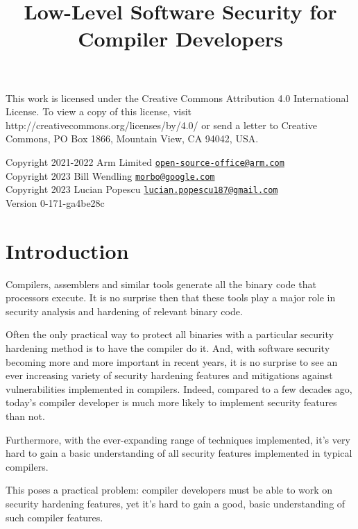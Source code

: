 \documentclass[
  a4paper,
]{report}
\title{Low-Level Software Security for Compiler Developers}
\author{}
\date{}
\begin{document}
\maketitle

\clearpage

\vspace*{\fill}
This work is licensed under the Creative Commons Attribution 4.0 International
License. To view a copy of this license, visit
http://creativecommons.org/licenses/by/4.0/ or send a letter to Creative
Commons, PO Box 1866, Mountain View, CA 94042, USA.

  Copyright 2021-2022 Arm Limited
\href{mailto:open-source-office@arm.com}{\nolinkurl{open-source-office@arm.com}}\\
  Copyright 2023 Bill Wendling
\href{mailto:morbo@google.com}{\nolinkurl{morbo@google.com}}\\
  Copyright 2023 Lucian Popescu
\href{mailto:lucian.popescu187@gmail.com}{\nolinkurl{lucian.popescu187@gmail.com}}\\

Version 0-171-ga4be28c
\clearpage

{
\hypersetup{linkcolor=}
\setcounter{tocdepth}{2}
\tableofcontents
}
\hypertarget{introduction}{%
\chapter{Introduction}\label{introduction}}

Compilers, assemblers and similar tools generate all the binary code
that processors execute. It is no surprise then that these tools play a
major role in security analysis and hardening of relevant binary code.

Often the only practical way to protect all binaries with a particular
security hardening method is to have the compiler do it. And, with
software security becoming more and more important in recent years, it
is no surprise to see an ever increasing variety of security hardening
features and mitigations against vulnerabilities implemented in
compilers. Indeed, compared to a few decades ago, today's compiler
developer is much more likely to implement security features than not.

Furthermore, with the ever-expanding range of techniques implemented,
it's very hard to gain a basic understanding of all security features
implemented in typical compilers.

This poses a practical problem: compiler developers must be able to work
on security hardening features, yet it's hard to gain a good, basic
understanding of such compiler features.
\end{document}

